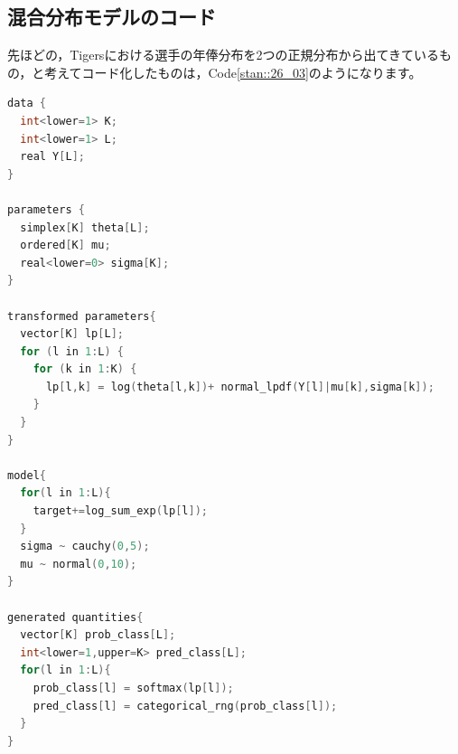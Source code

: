 \documentclass{ltjsbook}
\begin{document}
\subsection{混合分布モデルのコード}
先ほどの，Tigersにおける選手の年俸分布を2つの正規分布から出てきているもの，と考えてコード化したものは，Code\ref{stan::26_03}のようになります。
\begin{lstlisting}[language=C++,label={stan::26_03},caption={混合正規モデル}]
data {
  int<lower=1> K;
  int<lower=1> L;
  real Y[L];
}

parameters {
  simplex[K] theta[L];
  ordered[K] mu;
  real<lower=0> sigma[K];
}

transformed parameters{
  vector[K] lp[L];
  for (l in 1:L) {
    for (k in 1:K) {
      lp[l,k] = log(theta[l,k])+ normal_lpdf(Y[l]|mu[k],sigma[k]);
    }
  }
}

model{
  for(l in 1:L){
    target+=log_sum_exp(lp[l]);
  }
  sigma ~ cauchy(0,5);
  mu ~ normal(0,10);
}

generated quantities{
  vector[K] prob_class[L];
  int<lower=1,upper=K> pred_class[L];
  for(l in 1:L){
    prob_class[l] = softmax(lp[l]);
    pred_class[l] = categorical_rng(prob_class[l]);
  }
}
\end{lstlisting}
\end{document}
